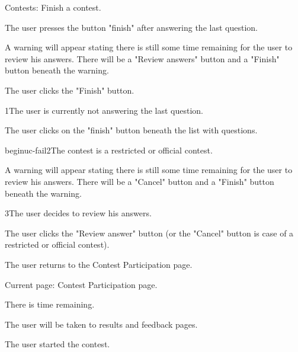 \begin{uc}{Contests: Finish a contest.}

    \begin{uc-mss}
    \item The user presses the button "finish" after answering the last question.
    \item A warning will appear stating there is still some time remaining for the user to review his answers. There will be a "Review answers" button and a "Finish" button beneath the warning.
    \item The user clicks the "Finish" button.
    \end{uc-mss}

    \begin{uc-ext}

        \begin{uc-fail}{1}{The user is currently not answering the last question.}
        \item The user clicks on the "finish" button beneath the list with questions.
        \end{uc-fail}

    begin{uc-fail}{2}{The contest is a restricted or official contest.}
    \item A warning will appear stating there is still some time remaining for the user to review his answers. There will be a "Cancel" button and a "Finish" button beneath the warning.

    \begin{uc-fail}{3}{The user decides to review his answers.}
    \item The user clicks the "Review answer" button (or the "Cancel" button is case of a restricted or official contest).
    \item The user returns to the Contest Participation page.
    \end{uc-fail}

    \end{uc-ext}

    \begin{uc-pre}
    \item Current page: Contest Participation page.
    \item There is time remaining.
    \end{uc-pre}

    \begin{uc-post}
    \item The user will be taken to results and feedback pages.
    \end{uc-post}

    \begin{uc-trig}
    The user started the contest.
    \end{uc-trig}

\end{uc}